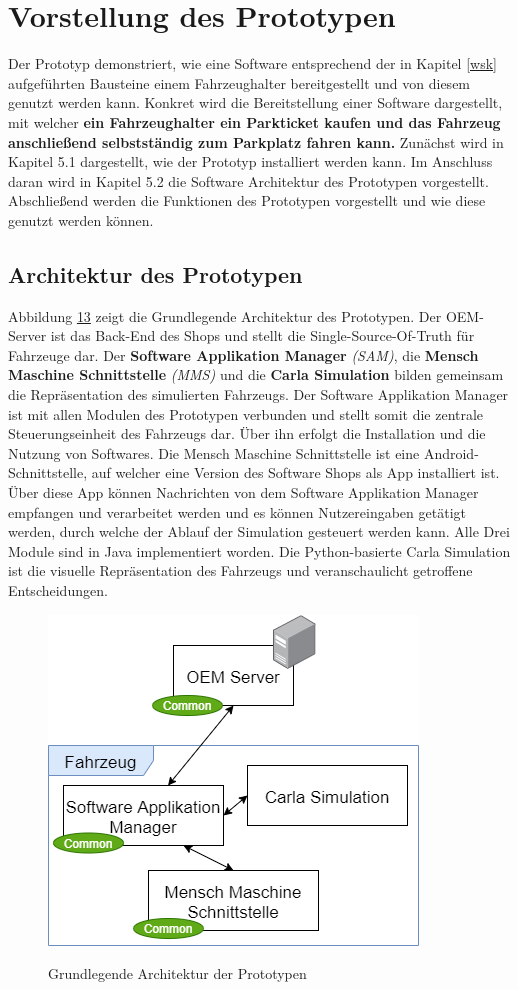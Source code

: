 \section{Vorstellung des Prototypen}\label{prototyp}
Der Prototyp demonstriert, wie eine Software entsprechend der in Kapitel \ref{wsk} aufgeführten Bausteine einem Fahrzeughalter bereitgestellt und von diesem genutzt werden kann. Konkret wird die Bereitstellung einer Software dargestellt, mit welcher \textbf{ein Fahrzeughalter ein Parkticket kaufen und das Fahrzeug anschließend selbstständig zum Parkplatz fahren kann.} Zunächst wird in Kapitel 5.1 dargestellt, wie der Prototyp installiert werden kann. Im Anschluss daran wird in Kapitel 5.2 die Software Architektur des Prototypen vorgestellt. Abschließend werden die Funktionen des Prototypen vorgestellt und wie diese genutzt werden können. 

\subsection{Architektur des Prototypen}	
Abbildung \hyperref[img:basic]{13} zeigt die Grundlegende Architektur des Prototypen. Der OEM-Server ist das Back-End des Shops und stellt die Single-Source-Of-Truth für Fahrzeuge dar. Der \textbf{Software Applikation Manager} \textit{(SAM)}, die \textbf{Mensch Maschine Schnittstelle} \textit{(MMS)} und die \textbf{Carla Simulation} bilden gemeinsam die Repräsentation des simulierten Fahrzeugs. Der Software Applikation Manager ist mit allen Modulen des Prototypen verbunden und stellt somit die zentrale Steuerungseinheit des Fahrzeugs dar. Über ihn erfolgt die Installation und die Nutzung von Softwares. Die Mensch Maschine Schnittstelle ist eine Android-Schnittstelle, auf welcher eine Version des Software Shops als App installiert ist. Über diese App können Nachrichten von dem Software Applikation Manager empfangen und verarbeitet werden und es können Nutzereingaben getätigt werden, durch welche der Ablauf der Simulation gesteuert werden kann. Alle Drei Module sind in Java implementiert worden. Die Python-basierte Carla Simulation ist die visuelle Repräsentation des Fahrzeugs und veranschaulicht getroffene Entscheidungen.
\begin{figure}[!h]
	\centering
	\includegraphics[width=0.5\columnwidth]{pictures/konzept-basic.png}
	\label{img:basic}
	\caption{Grundlegende Architektur der Prototypen}
\end{figure}

